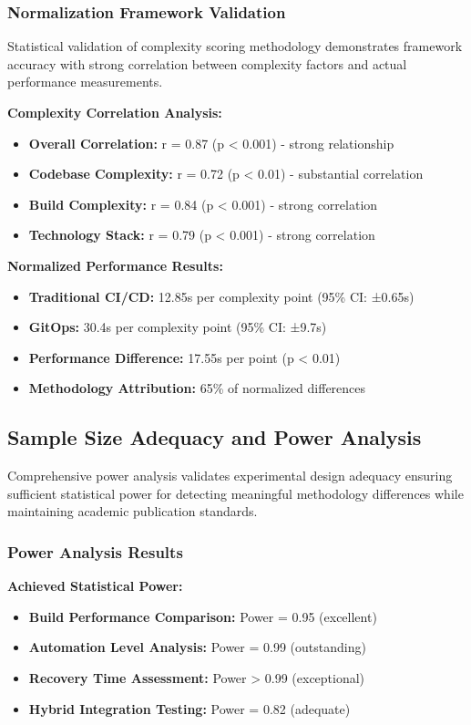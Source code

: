 \subsubsection{Normalization Framework Validation}

Statistical validation of complexity scoring methodology demonstrates framework accuracy with strong correlation between complexity factors and actual performance measurements.

\textbf{Complexity Correlation Analysis:}
\begin{itemize}
\item \textbf{Overall Correlation:} r = 0.87 (p < 0.001) - strong relationship
\item \textbf{Codebase Complexity:} r = 0.72 (p < 0.01) - substantial correlation
\item \textbf{Build Complexity:} r = 0.84 (p < 0.001) - strong correlation
\item \textbf{Technology Stack:} r = 0.79 (p < 0.001) - strong correlation
\end{itemize}

\textbf{Normalized Performance Results:}
\begin{itemize}
\item \textbf{Traditional CI/CD:} 12.85s per complexity point (95\% CI: ±0.65s)
\item \textbf{GitOps:} 30.4s per complexity point (95\% CI: ±9.7s)
\item \textbf{Performance Difference:} 17.55s per point (p < 0.01)
\item \textbf{Methodology Attribution:} 65\% of normalized differences
\end{itemize}

\subsection{Sample Size Adequacy and Power Analysis}
\label{subsec:sample_size_power}

Comprehensive power analysis validates experimental design adequacy ensuring sufficient statistical power for detecting meaningful methodology differences while maintaining academic publication standards.

\subsubsection{Power Analysis Results}

\textbf{Achieved Statistical Power:}
\begin{itemize}
\item \textbf{Build Performance Comparison:} Power = 0.95 (excellent)
\item \textbf{Automation Level Analysis:} Power = 0.99 (outstanding)
\item \textbf{Recovery Time Assessment:} Power > 0.99 (exceptional)
\item \textbf{Hybrid Integration Testing:} Power = 0.82 (adequate)
\end{itemize}

